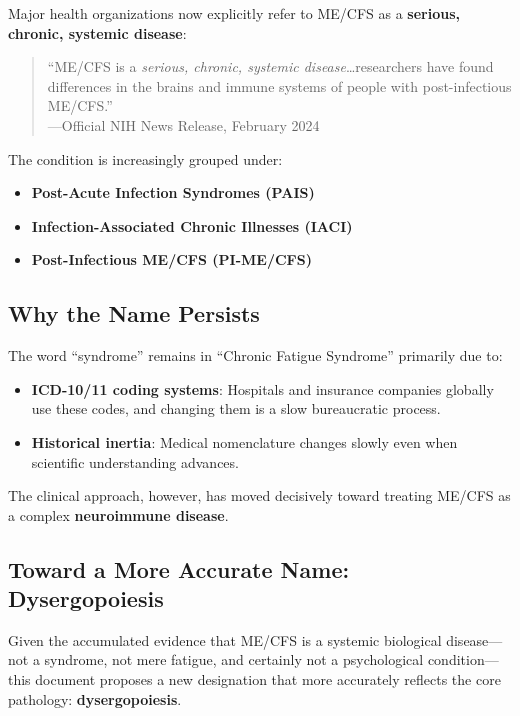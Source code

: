 Major health organizations now explicitly refer to ME/CFS as a \textbf{serious, chronic, systemic disease}:

\begin{quote}
``ME/CFS is a \emph{serious, chronic, systemic disease}\ldots researchers have found differences in the brains and immune systems of people with post-infectious ME/CFS.''\\
---Official NIH News Release, February 2024
\end{quote}

The condition is increasingly grouped under:
\begin{itemize}
    \item \textbf{Post-Acute Infection Syndromes (PAIS)}
    \item \textbf{Infection-Associated Chronic Illnesses (IACI)}
    \item \textbf{Post-Infectious ME/CFS (PI-ME/CFS)}
\end{itemize}

\subsection{Why the Name Persists}
\label{subsec:name-persistence}

The word ``syndrome'' remains in ``Chronic Fatigue Syndrome'' primarily due to:
\begin{itemize}
    \item \textbf{ICD-10/11 coding systems}: Hospitals and insurance companies globally use these codes, and changing them is a slow bureaucratic process.
    \item \textbf{Historical inertia}: Medical nomenclature changes slowly even when scientific understanding advances.
\end{itemize}

The clinical approach, however, has moved decisively toward treating ME/CFS as a complex \textbf{neuroimmune disease}.

\subsection{Toward a More Accurate Name: Dysergopoiesis}
\label{subsec:proposed-name-dysergopoiesis}

Given the accumulated evidence that ME/CFS is a systemic biological disease---not a syndrome, not mere fatigue, and certainly not a psychological condition---this document proposes a new designation that more accurately reflects the core pathology: \textbf{dysergopoiesis}.

